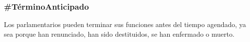 \subsubsection{\#TérminoAnticipado}

Los parlamentarios pueden terminar sus funciones antes del tiempo
agendado, ya sea porque han renunciado, han sido destituidos, se han
enfermado o muerto.

\begin{description}
  
\end{description}